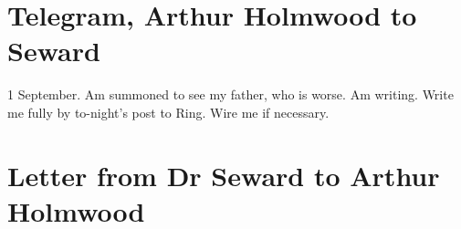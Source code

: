 \section{Telegram, Arthur Holmwood to Seward}
	
\begin{telegram}{1 September.}
Am summoned to see my father, who is worse. Am writing. Write me fully by to-night's post to Ring. Wire me if necessary.
\end{telegram}

\begin{letter}
	\clearpage
\end{letter}

\begin{a4}
	\clearpage
\end{a4}

\section{Letter from Dr Seward to Arthur Holmwood}

